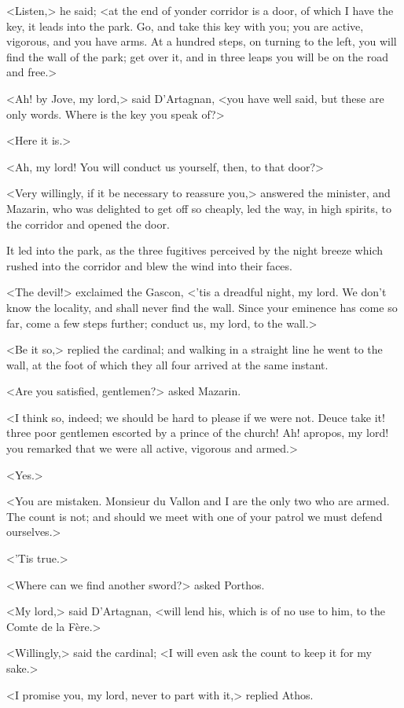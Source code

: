 <Listen,> he said; <at the end of yonder corridor is a door, of which I have the key, it leads into the park. Go, and take this key with you; you are active, vigorous, and you have arms. At a hundred steps, on turning to the left, you will find the wall of the park; get over it, and in three leaps you will be on the road and free.>

<Ah! by Jove, my lord,> said D'Artagnan, <you have well said, but these are only words. Where is the key you speak of?>

<Here it is.>

<Ah, my lord! You will conduct us yourself, then, to that door?>

<Very willingly, if it be necessary to reassure you,> answered the minister, and Mazarin, who was delighted to get off so cheaply, led the way, in high spirits, to the corridor and opened the door.

It led into the park, as the three fugitives perceived by the night breeze which rushed into the corridor and blew the wind into their faces.

<The devil!> exclaimed the Gascon, <'tis a dreadful night, my lord. We don't know the locality, and shall never find the wall. Since your eminence has come so far, come a few steps further; conduct us, my lord, to the wall.>

<Be it so,> replied the cardinal; and walking in a straight line he went to the wall, at the foot of which they all four arrived at the same instant.

<Are you satisfied, gentlemen?> asked Mazarin.

<I think so, indeed; we should be hard to please if we were not. Deuce take it! three poor gentlemen escorted by a prince of the church! Ah! apropos, my lord! you remarked that we were all active, vigorous and armed.>

<Yes.>

<You are mistaken. Monsieur du Vallon and I are the only two who are armed. The count is not; and should we meet with one of your patrol we must defend ourselves.>

<'Tis true.>

<Where can we find another sword?> asked Porthos.

<My lord,> said D'Artagnan, <will lend his, which is of no use to him, to the Comte de la Fère.>

<Willingly,> said the cardinal; <I will even ask the count to keep it for my sake.>

<I promise you, my lord, never to part with it,> replied Athos.


